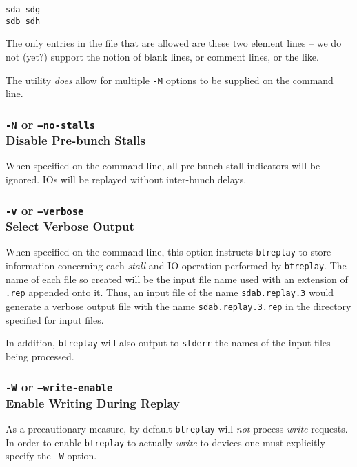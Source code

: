 \documentclass{article}
\begin{document}
\begin{verbatim}
sda sdg
sdb sdh
\end{verbatim}

The only entries in the file that are allowed are these two element lines
-- we do not (yet?) support the notion of blank lines, or comment lines, or
the like.

The utility \emph{does} allow for multiple \texttt{-M} options to be
supplied on the command line.

\subsubsection{\label{sec:o-N}\texttt{-N} or \texttt{--no-stalls}\\Disable
Pre-bunch Stalls}

When specified on the command line, all pre-bunch stall indicators will be
ignored. IOs will be replayed without inter-bunch delays.

\subsubsection{\label{sec:p-o-v}\texttt{-v} or
\texttt{--verbose}\\Select Verbose Output}

When specified on the command line, this option instructs \texttt{btreplay}
to store information concerning each \emph{stall} and IO operation
performed by \texttt{btreplay}. The name of each file so created will be
the input file name used with an extension of \texttt{.rep} appended onto
it. Thus, an input file of the name \texttt{sdab.replay.3} would generate a
verbose output file with the name \texttt{sdab.replay.3.rep} in the
directory specified for input files.

In addition, \texttt{btreplay} will also output to \texttt{stderr} the
names of the input files being processed.

\subsubsection{\label{sec:p-o-W}\texttt{-W} or
\texttt{--write-enable}\\Enable Writing During Replay}

As a precautionary measure, by default \texttt{btreplay} will \emph{not}
process \emph{write} requests. In order to enable \texttt{btreplay} to
actually \emph{write} to devices one must explicitly specify the
\texttt{-W} option.
\end{document}
